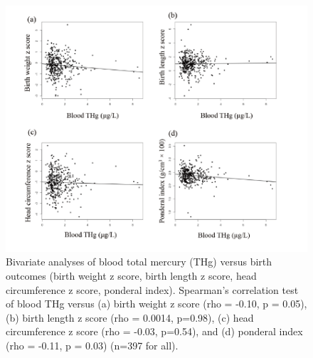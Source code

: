 \begin{figure}
  \centering
    \label{fig:Fig317}
  \includegraphics[scale=1]{Figures/Fig317.pdf}
  \caption[Bivariate analyses of blood total mercury versus birth outcomes (birth weight z score, birth length z score, head circumference z score, ponderal index)]{Bivariate analyses of blood total mercury (THg) versus birth outcomes (birth weight z score, birth length z score, head circumference z score, ponderal index). Spearman's correlation test of blood THg versus (a) birth weight z score (rho = -0.10, p = 0.05), (b) birth length z score (rho = 0.0014, p=0.98), (c) head circumference z score (rho = -0.03, p=0.54), and (d) ponderal index (rho = -0.11, p = 0.03) (n=397 for all).}
\end{figure}


